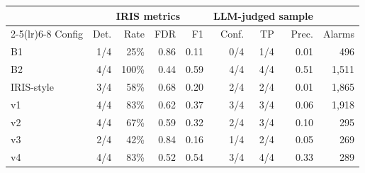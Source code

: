 \begin{tabular}{@{}lrrrrrrrr@{}}
\toprule
 & \multicolumn{4}{c}{IRIS metrics} & \multicolumn{3}{c}{LLM-judged sample} & \\
\cmidrule(lr){2-5}\cmidrule(lr){6-8}
Config & Det. & Rate & FDR & F1 & Conf. & TP & Prec. & Alarms \\
\midrule
B1 & 1/4 & 25\% & 0.86 & 0.11 & 0/4 & 1/4 & 0.01 & 496 \\
B2 & 4/4 & 100\% & 0.44 & 0.59 & 4/4 & 4/4 & 0.51 & 1,511 \\
IRIS-style & 3/4 & 58\% & 0.68 & 0.20 & 2/4 & 2/4 & 0.01 & 1,865 \\
v1 & 4/4 & 83\% & 0.62 & 0.37 & 3/4 & 3/4 & 0.06 & 1,918 \\
v2 & 4/4 & 67\% & 0.59 & 0.32 & 2/4 & 3/4 & 0.10 & 295 \\
v3 & 2/4 & 42\% & 0.84 & 0.16 & 1/4 & 2/4 & 0.05 & 269 \\
v4 & 4/4 & 83\% & 0.52 & 0.54 & 3/4 & 4/4 & 0.33 & 289 \\
\bottomrule
\end{tabular}
